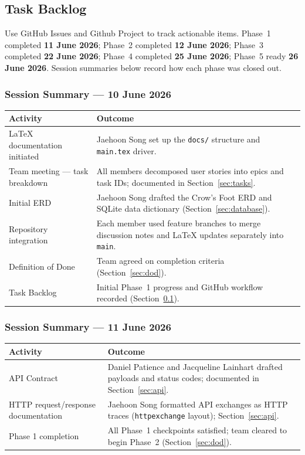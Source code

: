 \subsection{Task Backlog}\label{sec:task-backlog}
Use GitHub Issues and Github Project to track actionable items. Phase~1 completed \textbf{11 June 2026};
Phase~2 completed \textbf{12 June 2026}; Phase~3 completed \textbf{22 June 2026};
Phase~4 completed \textbf{25 June 2026}; Phase~5 ready \textbf{26 June 2026}.
Session summaries below record how each phase was closed out.

\subsubsection{Session Summary --- 10 June 2026}
\begin{tabularx}{\textwidth}{@{} l X @{}}
  \toprule
  \textbf{Activity} & \textbf{Outcome} \\
  \midrule
  LaTeX documentation initiated & Jaehoon Song set up the \texttt{docs/} structure and \texttt{main.tex} driver. \\
  Team meeting --- task breakdown & All members decomposed user stories into epics and task IDs; documented in Section~\ref{sec:tasks}. \\
  Initial ERD & Jaehoon Song drafted the Crow's Foot ERD and SQLite data dictionary (Section~\ref{sec:database}). \\
  Repository integration & Each member used feature branches to merge discussion notes and LaTeX updates separately into \texttt{main}. \\
  Definition of Done & Team agreed on completion criteria (Section~\ref{sec:dod}). \\
  Task Backlog & Initial Phase~1 progress and GitHub workflow recorded (Section~\ref{sec:task-backlog}). \\
  \bottomrule
\end{tabularx}

\subsubsection{Session Summary --- 11 June 2026}
\begin{tabularx}{\textwidth}{@{} l X @{}}
  \toprule
  \textbf{Activity} & \textbf{Outcome} \\
  \midrule
  API Contract & Daniel Patience and Jacqueline Lainhart drafted payloads and status codes; documented in Section~\ref{sec:api}. \\
  HTTP request/response documentation & Jaehoon Song formatted API exchanges as HTTP traces (\texttt{httpexchange} layout); Section~\ref{sec:api}. \\
  Phase 1 completion & All Phase~1 checkpoints satisfied; team cleared to begin Phase~2 (Section~\ref{sec:dod}). \\
  \bottomrule
\end{tabularx}

